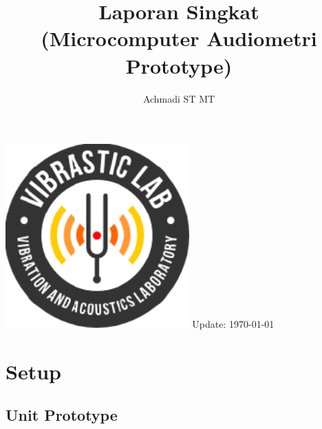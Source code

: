 \documentclass[12pt,]{article}
\title{\LARGE \bf
	Laporan Singkat\\
	\small{(Microcomputer Audiometri Prototype)}
}
\author{Achmadi ST MT}
\date{}
\begin{document}
	\thispagestyle{empty}
	
	\begin{titlepage}
		\centering
		\vfill
		\vfill
		\maketitle
		\vfill
		\includegraphics[width=200pt]{images/logo/logoviblab}
		\vfill
		\vfill
		Update: {\today} \currenttime \\
	\end{titlepage}
	
	
	\section{Setup}
	
	\subsection{Unit Prototype}
	
\end{document}
